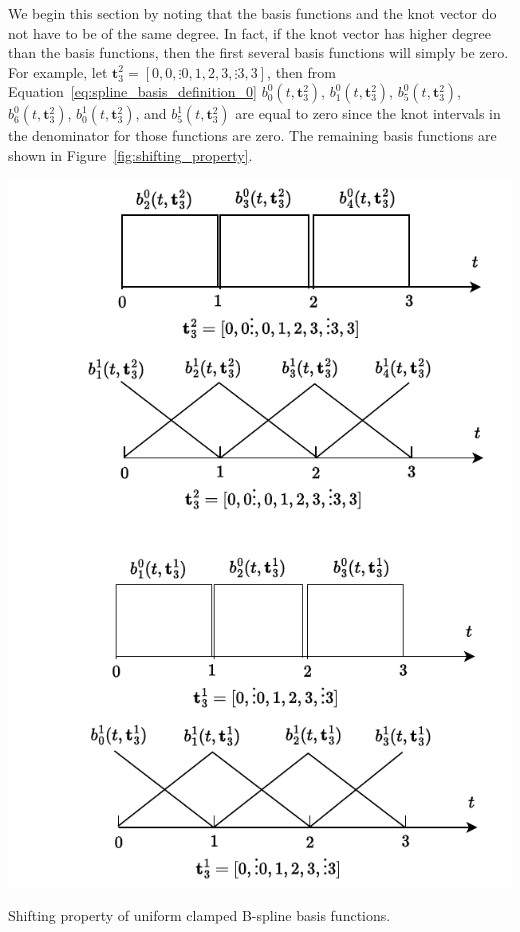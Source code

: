 

We begin this section by noting that the basis functions and the knot vector do not have to be of the same degree.  In fact, if the knot vector has higher degree than the basis functions, then the first several basis functions will simply be zero.  
For example, let $\mathbf{t}_3^2 = [0, 0,\vdots 0, 1, 2, 3, \vdots 3, 3]$, then from Equation~\eqref{eq:spline_basis_definition_0} $b_0^0(t,  \mathbf{t}_3^2)$, $b_1^0(t,  \mathbf{t}_3^2)$, $b_5^0(t,  \mathbf{t}_3^2)$, $b_6^0(t,  \mathbf{t}_3^2)$, $b_0^1(t,  \mathbf{t}_3^2)$, and $b_5^1(t,  \mathbf{t}_3^2)$ are equal to zero since the knot intervals in the denominator for those functions are zero.  The remaining basis functions are shown in Figure~\ref{fig:shifting_property}.
\begin{marginfigure}[0in]
  \includegraphics[width=\linewidth]{./chap5_trajectory_planning/figures/shifting_property.drawio}
  \caption{Shifting property of uniform clamped B-spline basis functions.}
  \label{fig:shifting_property}  
\end{marginfigure}
